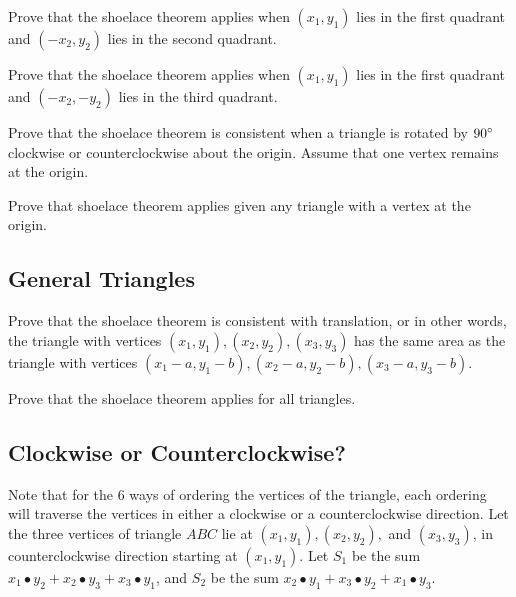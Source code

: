 \documentclass[11pt]{article}
\begin{document}
\begin{problem} \normalfont Prove that the shoelace theorem applies when $(x_1, y_1)$ lies in the first quadrant and $(-x_2, y_2)$ lies in the second quadrant. \end{problem}

\begin{solution}

\end{solution}

\begin{problem} \normalfont Prove that the shoelace theorem applies when $(x_1, y_1)$ lies in the first quadrant and $(-x_2, -y_2)$ lies in the third quadrant. \end{problem}

\begin{problem} \normalfont Prove that the shoelace theorem is consistent when a triangle is rotated by $90\degree$ clockwise or counterclockwise about the origin. Assume that one vertex remains at the origin. \end{problem}

\begin{problem} \normalfont Prove that shoelace theorem applies given any triangle with a vertex at the origin. \end{problem}

\subsection{General Triangles}
\begin{problem} \normalfont Prove that the shoelace theorem is consistent with translation, or in other words, the triangle with vertices $(x_1, y_1), (x_2, y_2), (x_3, y_3)$ has the same area as the triangle with vertices $(x_1 - a, y_1 - b), (x_2 - a, y_2 - b ), (x_3 - a, y_3 - b)$. \end{problem}

\begin{problem} \normalfont Prove that the shoelace theorem applies for all triangles. \end{problem}

\subsection{Clockwise or Counterclockwise?}
Note that for the 6 ways of ordering the vertices of the triangle, each ordering will traverse the vertices in either a clockwise or a counterclockwise direction. 
\newline \noindent Let the three vertices of triangle $ABC$ lie at $(x_1, y_1), (x_2, y_2),$  and $(x_3, y_3)$, in counterclockwise direction starting at $(x_1, y_1)$. 
Let $S_1$ be the sum $x_1 \bullet y_2 + x_2 \bullet y_3 + x_3 \bullet y_1$, and $S_2$ be the sum $x_2 \bullet y_1 + x_3 \bullet y_2 + x_1 \bullet y_3$.
\end{document}
